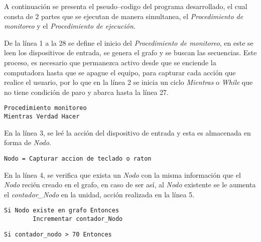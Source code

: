 
A continuaci\'on se presenta el pseudo--codigo del programa desarrollado, el
 cual consta de 2 partes que se ejecutan de manera simultanea, el 
 \emph{Procedimiento de monitoreo} y el \emph{Procedimiento de ejecuci\'on}.

De la l\'inea 1 a la 28 se define el inicio del \emph{Procedimiento de monitoreo}, en este se leen los dispositivos de entrada, se genera el grafo y se buscan las secuencias. Este proceso, es necesario que permanezca activo desde que se enciende la computadora hasta que se apague el equipo, para capturar cada acci\'on que realice el usuario, por lo que en la l\'inea 2 se inicia un ciclo \emph{Mientras} o \emph{While} que no tiene condici\'on de paro y abarca hasta la l\'inea 27. 

\begin{tiny}
\begin{lstlisting}[style=C]
Procedimiento monitoreo
Mientras Verdad Hacer
\end{lstlisting}
\end{tiny}

En la l\'inea 3, se le\'e la acci\'on del dispositivo de entrada y esta es almacenada en forma de \emph{Nodo}.


\begin{tiny}
\begin{lstlisting}[style=C]
    Nodo = Capturar accion de teclado o raton
\end{lstlisting}
\end{tiny}

En la l\'inea 4, se verifica que exista un \emph{Nodo} con la misma informaci\'on que el \emph{Nodo} reci\'en creado en el grafo, en caso de ser as\'i, al \emph{Nodo} existente se le aumenta el \emph{contador\_Nodo} en la unidad, acci\'on realizada en la l\'inea 5.

\begin{tiny}
\begin{lstlisting}[style=C]
    Si Nodo existe en grafo Entonces
        Incrementar contador_Nodo
\end{lstlisting}
\end{tiny}





\begin{tiny}
\begin{lstlisting}[style=C]
        Si contador_nodo > 70 Entonces
\end{lstlisting}
\end{tiny}



